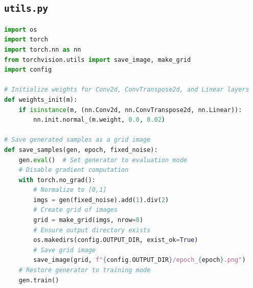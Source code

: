 \documentclass[11pt]{article}
\begin{document}
\subsection{\texttt{utils.py}}
\begin{lstlisting}[language=Python, caption={Utilities}, label={lst:config}, frame=single, basicstyle=\ttfamily\small, keywordstyle=\color{blue}\bfseries, commentstyle=\color{green!50!black}, stringstyle=\color{red!70!black}]
import os
import torch
import torch.nn as nn
from torchvision.utils import save_image, make_grid
import config

# Initialize weights for Conv2d, ConvTranspose2d, and Linear layers
def weights_init(m):
    if isinstance(m, (nn.Conv2d, nn.ConvTranspose2d, nn.Linear)):
        nn.init.normal_(m.weight, 0.0, 0.02)

# Save generated samples as a grid image
def save_samples(gen, epoch, fixed_noise):
    gen.eval()  # Set generator to evaluation mode
    # Disable gradient computation
    with torch.no_grad():  
        # Normalize to [0,1]
        imgs = gen(fixed_noise).add(1).div(2)  
        # Create grid of images
        grid = make_grid(imgs, nrow=8)  
        # Ensure output directory exists
        os.makedirs(config.OUTPUT_DIR, exist_ok=True)  
        # Save grid image
        save_image(grid, f"{config.OUTPUT_DIR}/epoch_{epoch}.png")  
    # Restore generator to training mode
    gen.train()  

\end{lstlisting}
\end{document}
